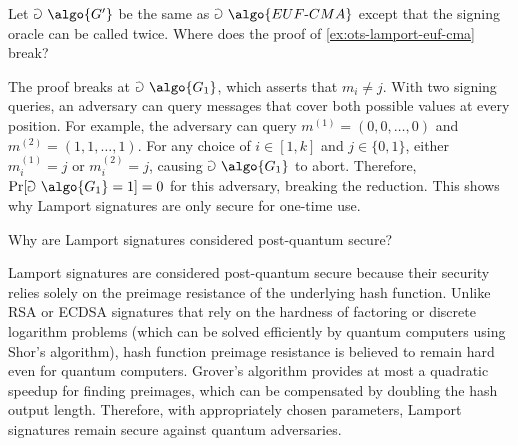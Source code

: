 \begin{exercise}
  Let $\Game~\algo{G'}$ be the same as $\Game~\algo{EUF\text{-}CMA}$ except that the signing oracle can be called twice.
  Where does the proof of \autoref{ex:ots-lamport-euf-cma} break?
\end{exercise}

\ifsolutions
\begin{mysolution}
  The proof breaks at $\Game~\algo{G_1}$, which asserts that $m_i \neq j$.
  With two signing queries, an adversary can query messages that cover both possible values at every position.
  For example, the adversary can query $m^{(1)} = (0, 0, \ldots, 0)$ and $m^{(2)} = (1, 1, \ldots, 1)$.
  For any choice of $i \in [1,k]$ and $j \in \{0,1\}$, either $m^{(1)}_i = j$ or $m^{(2)}_i = j$, causing $\Game~\algo{G_1}$ to abort.
  Therefore, $\Pr[\Game~\algo{G_1} = 1] = 0$ for this adversary, breaking the reduction.
  This shows why Lamport signatures are only secure for one-time use.
\end{mysolution}
\fi

\begin{exercise}[Optional]
  Why are Lamport signatures considered post-quantum secure?
\end{exercise}

\ifsolutions
\begin{mysolution}
  Lamport signatures are considered post-quantum secure because their security relies solely on the preimage resistance of the underlying hash function.
  Unlike RSA or ECDSA signatures that rely on the hardness of factoring or discrete logarithm problems (which can be solved efficiently by quantum computers using Shor's algorithm), hash function preimage resistance is believed to remain hard even for quantum computers.
  Grover's algorithm provides at most a quadratic speedup for finding preimages, which can be compensated by doubling the hash output length.
  Therefore, with appropriately chosen parameters, Lamport signatures remain secure against quantum adversaries.
\end{mysolution}
\fi

